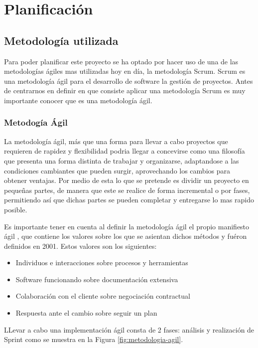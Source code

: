 \chapter{Planificación}

\section{Metodología utilizada}

Para poder planificar este proyecto se ha optado por hacer uso de una de las metodologías ágiles mas utilizadas hoy en día, la metodología Scrum. Scrum es una metodología ágil para el desarrollo de software la gestión de proyectos. Antes de centrarnos en definir en que consiste aplicar una metodología Scrum es muy importante conocer que es una metodología ágil.

\subsection{Metodogía Ágil}

La metodología ágil, más que una forma para llevar a cabo proyectos que requieren de rapidez y flexibilidad podria llegar a concevirse como una filosofía que presenta una forma distinta de trabajar y organizarse, adaptandose a las condiciones cambiantes que pueden surgir, aprovechando los cambios para obtener ventajas. Por medio de esta lo que se pretende es dividir un proyecto en pequeñas partes, de manera que este se realice de forma incremental o por fases, permitiendo así que dichas partes se pueden completar y entregarse lo mas rapido posible. 

Es importante tener en cuenta al definir la metodología ágil el propio manifiesto ágil \cite{manifiesto-agil}, que contiene los valores sobre los que se asientan dichos métodos y fuéron definidos en 2001. Estos valores son los siguientes:

\begin{itemize}
	\item Individuos e interacciones sobre procesos y herramientas
	\item Software funcionando sobre documentación extensiva
	\item Colaboración con el cliente sobre negociación contractual
	\item Respuesta ante el cambio sobre seguir un plan
\end{itemize}

LLevar a cabo una implementación ágil consta de 2 fases: análisis y realización de Sprint como se muestra en la Figura \ref{fig:metodologia-agil}.

